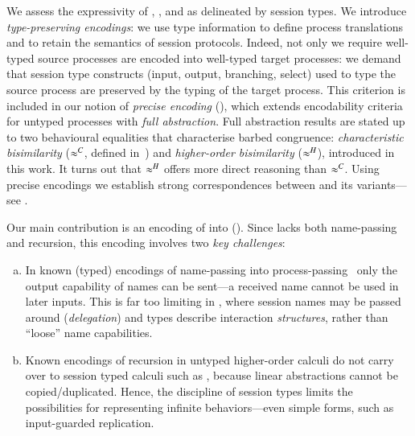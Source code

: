 We assess the expressivity  of \HOp, \HO, and \sessp as delineated by session types. 
We introduce \emph{type-preserving encodings}:
we use type information to define process translations
and to retain the semantics of session protocols. 
Indeed,  not only we require 
well-typed source processes are encoded into 
well-typed target processes: 
we demand that session type constructs (input, output, branching, select) used to type the source process
are preserved by the typing of the target process.
This criterion is included in 
our notion of \emph{precise encoding} (), which 
extends encodability criteria for untyped processes with 
\emph{full abstraction}.
{Full abstraction results are stated
up to two
behavioural equalities that characterise barbed congruence:
\emph{characteristic bisimilarity} ($\approx^C$, defined in~\cite{characteristic_bis})
and 
\emph{higher-order bisimilarity} ($\approx^H$), introduced in this
work.
It turns out that $\approx^H$ offers more direct  reasoning than $\approx^C$. }
Using precise encodings we establish strong correspondences between 
\HOp and its variants---see . 



Our main contribution is 
an encoding of \HOp into \HO ().  
Since \HO lacks 
both name-passing and recursion, this encoding involves two \emph{key challenges}:
\begin{enumerate}[a.]
\item In known (typed) 
encodings of name-passing into process-passing~\cite{SaWabook} %
only the output capability of names can be sent---a received name cannot be used in later inputs.
This is far too limiting in \HOp, where 
 session names %
 may be passed around (\emph{delegation})
and types describe interaction  \emph{structures}, rather than ``loose'' name capabilities. %



\item %
Known encodings of recursion in untyped higher-order calculi
do not carry over to session typed calculi such as \HOp,
because linear abstractions cannot be copied/duplicated. Hence, the discipline of session types  limits 
the possibilities for representing infinite behaviors---even simple forms, such as input-guarded replication.
\end{enumerate}




